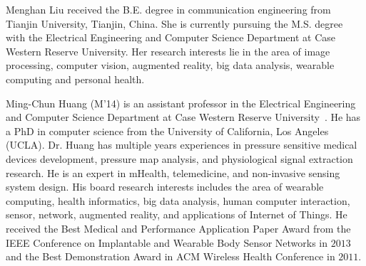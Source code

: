 \begin{IEEEbiography}
{Menghan Liu} received the B.E. degree in communication engineering from Tianjin University, Tianjin, China. She is currently pursuing the M.S. degree with the Electrical Engineering and Computer Science Department at Case Western Reserve University. Her research interests lie in the area of image processing, computer vision, augmented reality, big data analysis, wearable computing and personal health.
\end{IEEEbiography}
\begin{IEEEbiography}
{Ming-Chun Huang} (M'14) is an assistant professor in the Electrical Engineering and Computer Science Department at Case Western Reserve
University~\cite{Sailab}. He has a PhD in computer science from the University of California, Los Angeles (UCLA). Dr. Huang has multiple years
experiences in pressure sensitive medical devices development, pressure map analysis, and physiological signal extraction research.
He is an expert in mHealth, telemedicine, and non-invasive sensing system design. His board research interests includes the area of
wearable computing, health informatics, big data analysis, human computer interaction, sensor, network, augmented reality, and
applications of Internet of Things. He received the Best Medical and Performance Application Paper Award from the IEEE Conference on
Implantable and Wearable Body Sensor Networks in $2013$ and the Best Demonstration Award in ACM Wireless Health Conference in $2011$.
\end{IEEEbiography} 